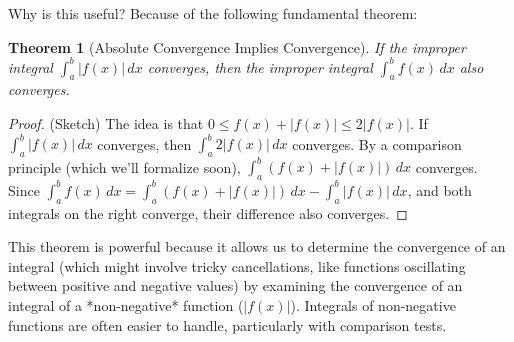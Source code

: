 \documentclass[11pt]{article}
\newtheorem{theorem}{Theorem}[section]
\theoremstyle{definition}
\newcommand{\dx}{\, dx} %
\begin{document}
Why is this useful? Because of the following fundamental theorem:

\begin{theorem}[Absolute Convergence Implies Convergence]
    If the improper integral $\int_a^b |f(x)| \dx$ converges, then the improper integral $\int_a^b f(x) \dx$ also converges.
\end{theorem}

\begin{proof} (Sketch)
    The idea is that $0 \le f(x) + |f(x)| \le 2|f(x)|$. If $\int_a^b |f(x)| \dx$ converges, then $\int_a^b 2|f(x)| \dx$ converges. By a comparison principle (which we'll formalize soon), $\int_a^b (f(x) + |f(x)|) \dx$ converges. Since $\int_a^b f(x) \dx = \int_a^b (f(x) + |f(x)|) \dx - \int_a^b |f(x)| \dx$, and both integrals on the right converge, their difference also converges.
\end{proof}

This theorem is powerful because it allows us to determine the convergence of an integral (which might involve tricky cancellations, like functions oscillating between positive and negative values) by examining the convergence of an integral of a *non-negative* function ($|f(x)|$). Integrals of non-negative functions are often easier to handle, particularly with comparison tests.
\end{document}
